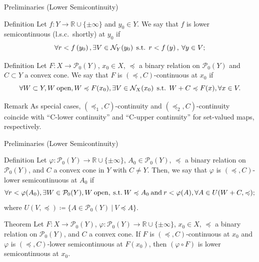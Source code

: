 \documentclass[aspectratio=169, dvipdfmx, 11pt]{beamer}
\newcommand{\RealNumberSet}{\mathbb{R}}
\newcommand{\Nbd}[2]{\mbox{$\mathcal{N}_{#1}({#2})$}}
\newcommand{\pow}[1]{\mathcal{P}_{0}(#1)}
\newcommand{\SuchThat}{\:\text{s.t.}\:}
\newcommand{\SetForm}[2]{
  \{{#1}\:|\:{#2}\}
}
\begin{document}
\begin{frame}{Preliminaries (Lower Semicontinuity)}
  \begin{block}{Definition}
    Let $f:Y\rightarrow \RealNumberSet \cup \{ \pm \infty\}$ and $y_{0}\in{Y}$.
    We say that $f$ is
    lower semicontinuous (l.s.c.\ shortly) at $y_{0}$ if
    \begin{equation}
      \forall r < f \left( y_{0} \right),
      \exists V \in \Nbd{Y}{y_{0}} \:\SuchThat\: r < f \left( y \right),\: \forall y \in V; \notag
    \end{equation}
  \end{block}

  \begin{block}{Definition \cite{500001551932}}
    Let $F \colon X \to \pow{Y}$, $x_0 \in X$, $\preccurlyeq$ a binary relation on $\pow{Y}$
    and $C \subset Y$ a convex cone. We say that $F$ is $(\preccurlyeq, C)$-continuous at $x_0$ if
    \begin{equation}
      \forall W \subset Y, W\:\text{open},W \preccurlyeq F(x_0), \exists V \in \mathcal{N}_{X}(x_0) \:\SuchThat\: W + C \preccurlyeq F(x), \forall x \in V. \notag
    \end{equation}
  \end{block}

  \begin{alertblock}{Remark}
    As special cases, $(\preccurlyeq_1, C)$-continuity and $(\preccurlyeq_2, C)$-continuity coincide with “C-lower
    continuity” and “C-upper continuity” for set-valued maps, respectively.
  \end{alertblock}
\end{frame}

\begin{frame}{Preliminaries (Lower Semicontinuity)}
  \begin{block}{Definition \cite{500001551932}}
    Let $\varphi \colon \pow{Y} \to \RealNumberSet \cup \{\pm \infty\}$, $A_0 \in \pow{Y}$,
    $\preccurlyeq$ a binary relation on $\pow{Y}$, and $C$ a convex cone in $Y$ with $C \ne Y$. Then,
    we say that $\varphi$ is $(\preccurlyeq, C)$-lower semicontinuous at $A_0$ if
    \begin{equation}
      \forall r < \varphi (A_0), \exists W \in \pow{Y}, W\:\text{open}, \SuchThat W \preccurlyeq A_0 \:\text{and}\:
      r < \varphi (A), \forall A \in U(W + C, \preccurlyeq); \notag
    \end{equation}
    where $U(V,\preccurlyeq) \coloneqq \SetForm{A \in \pow{Y}}{V \preccurlyeq A}$.
  \end{block}

  \begin{block}{Theorem \cite{500001551932}}
    Let $F \colon X \to \pow{Y}$, $\varphi \colon \pow{Y} \to \RealNumberSet \cup \{\pm \infty\}$, $x_0 \in X$,
    $\preccurlyeq$ a binary relation on $\pow{Y}$, and $C$ a convex cone. If $F$ is $(\preccurlyeq, C)$-continuous at $x_0$
    and $\varphi$ is $(\preccurlyeq, C)$-lower semicontinuous at $F(x_0)$, then $(\varphi \circ F)$ is lower semicontinuous at $x_0$.
  \end{block}
\end{frame}
\end{document}
